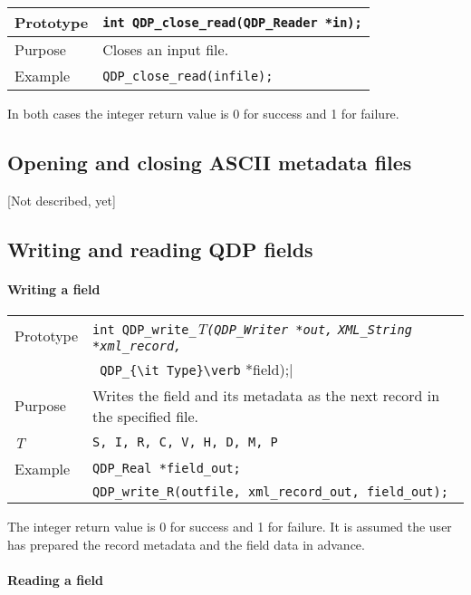 \documentclass{article}
\newcommand{\allTypes}{{\tt S, I, R, C, V, H, D, M, P}}
\newcommand{\itt}{\it T}
\newcommand{\QMDhandle}{{\tt XML\_String}}
\begin{document}
\begin{flushleft}
  \begin{tabular}{|l|l|}
  \hline
  Prototype      & \verb|int QDP_close_read(QDP_Reader *in);| \\
    \hline
  Purpose        & Closes an input file. \\
\hline
  Example        & \verb|QDP_close_read(infile);|\\
   \hline
 \end{tabular}
\end{flushleft}
%
In both cases the integer return value is 0 for success and 1 for failure.

\subsection{Opening and closing ASCII metadata files}
[Not described, yet]

\subsection{Writing and reading QDP fields}

\paragraph{Writing a field}

\begin{flushleft}
  \begin{tabular}{|l|l|}
  \hline
  Prototype      & \verb|int QDP_write_|\itt\verb|(QDP_Writer *out,| \QMDhandle \verb| *xml_record,|\\
                 & \verb| QDP_{\it Type}\verb| *field);|\\
    \hline
  Purpose        & Writes the field and its metadata as the next record in the specified file. \\
\hline
  \itt     & \allTypes \\
   \hline
  Example  & \verb|QDP_Real *field_out;| \\
           & \verb|QDP_write_R(outfile, xml_record_out, field_out);| \\
   \hline
 \end{tabular}
\end{flushleft}
%
The integer return value is 0 for success and 1 for failure.  It is
assumed the user has prepared the record metadata and the field data
in advance.

\paragraph{Reading a field}
\end{document}
